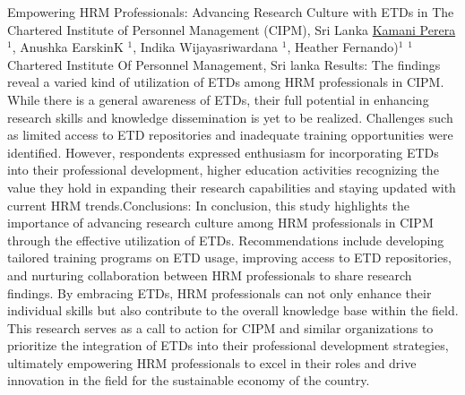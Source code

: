 \begin{abstract_online}{Empowering HRM Professionals: Advancing Research Culture with ETDs in The Chartered Institute of Personnel Management (CIPM), Sri Lanka}{%
        \underline{Kamani Perera}$^{1}$, Anushka EarskinK $^{1}$, Indika Wijayasriwardana $^{1}$, Heather Fernando)$^{1}$}{%
        }{%
        $^1$ Chartered Institute Of Personnel Management, Sri lanka}
      Results: The findings reveal a varied kind of utilization of ETDs among HRM professionals in CIPM. While there is a general awareness of ETDs, their full potential in enhancing research skills and knowledge dissemination is yet to be realized. Challenges such as limited access to ETD repositories and inadequate training opportunities were identified. However, respondents expressed enthusiasm for incorporating ETDs into their professional development, higher education activities recognizing the value they hold in expanding their research capabilities and staying updated with current HRM trends.Conclusions: In conclusion, this study highlights the importance of advancing research culture among HRM professionals in CIPM through the effective utilization of ETDs. Recommendations include developing tailored training programs on ETD usage, improving access to ETD repositories, and nurturing collaboration between HRM professionals to share research findings. By embracing ETDs, HRM professionals can not only enhance their individual skills but also contribute to the overall knowledge base within the field. This research serves as a call to action for CIPM and similar organizations to prioritize the integration of ETDs into their professional development strategies, ultimately empowering HRM professionals to excel in their roles and drive innovation in the field for the sustainable economy of the country.
    \end{abstract_online}
    
